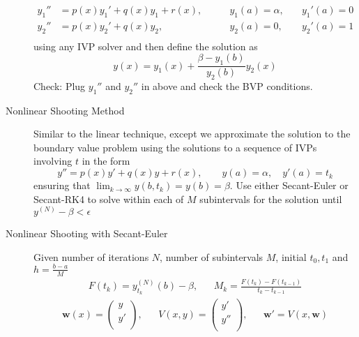 \documentclass[8pt]{article}
\begin{document}
\begin{multicols}{2}
\begin{description}
\begin{equation*}
      \begin{aligned}
        y_1'' &= p(x)y_1' + q(x)y_1 + r(x), &\qquad y_1(a)=\alpha,&\quad y_1'(a)=0 \\
        y_2'' &= p(x)y_2' + q(x)y_2, &\qquad y_2(a)=0,&\quad y_2'(a) = 1\\
      \end{aligned}
    \end{equation*}
    using any IVP solver and then define the solution as 
    $$ y(x) = y_1(x)+\frac{\beta - y_1(b)}{y_2(b)}y_2(x) $$
    Check: Plug $y_1''$ and $y_2''$ in above and check the BVP
    conditions.
  \item[Nonlinear Shooting Method] Similar to the linear technique,
    except we approximate the solution to the boundary value problem
    using the solutions to a sequence of IVPs involving $t$ in the
    form
    $$ y'' = p(x)y' + q(x)y + r(x), \qquad y(a)=\alpha,\quad y'(a)=t_k $$
    ensuring that $\lim_{k\rightarrow\infty}y(b,t_k)=y(b)=\beta$.
    Use either Secant-Euler or Secant-RK4 to solve within each of $M$
    subintervals for the solution until $y^{(N)}-\beta < \epsilon$
  \item[Nonlinear Shooting with Secant-Euler] Given number of iterations $N$,
    number of subintervals $M$, initial $t_0, t_1$ and $h=\frac{b-a}{M}$
    \begin{equation*}
      \begin{aligned}
        F(t_k) = y^{(N)}_{t_k}(b) - \beta, &&
        M_k = \frac{F(t_{k})-F(t_{k-1})}{t_{k}-t_{k-1}}
      \end{aligned}
    \end{equation*}
    \begin{equation*}
      \begin{aligned}
         \mathbf{w}(x) = \begin{pmatrix}
          y \\
          y' \\
        \end{pmatrix}, && V(x,y) =
        \begin{pmatrix}
          y' \\
          y'' \\
        \end{pmatrix}, && \mathbf{w}' = V(x,\mathbf{w})
      \end{aligned}
    \end{equation*}

\end{description}
\end{multicols}
\end{document}
